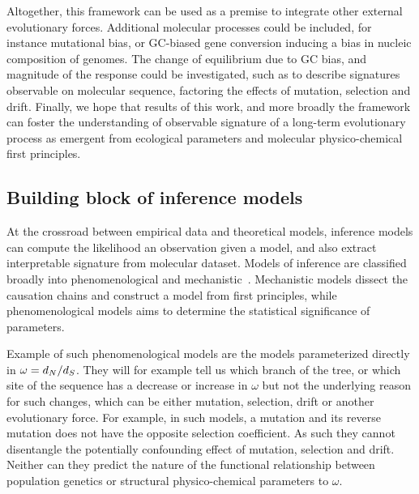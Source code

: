 Altogether, this framework can be used as a premise to integrate other external evolutionary forces. %
Additional molecular processes could be included, for instance mutational bias, or GC-biased gene conversion inducing a bias in nucleic composition of genomes.
The change of equilibrium due to GC bias, and magnitude of the response could be investigated, such as to describe signatures observable on molecular sequence, factoring the effects of mutation, selection and drift.
Finally, we hope that results of this work, and more broadly the framework can foster the understanding of observable signature of a long-term evolutionary process as emergent from ecological parameters and molecular physico-chemical first principles.

\subsection{Building block of inference models}

At the crossroad between empirical data and theoretical models, inference models can compute the likelihood an observation given a model, and also extract interpretable signature from molecular dataset.
Models of inference are classified broadly into phenomenological and mechanistic~\citep{Rodrigue2010a}.
Mechanistic models dissect the causation chains and construct a model from first principles, while phenomenological models aims to determine the statistical significance of parameters.

Example of such phenomenological models are the models parameterized directly in $\omega = d_N / d_S$.
They will for example tell us which branch of the tree, or which site of the sequence has a decrease or increase in $\omega$ but not the underlying reason for such changes, which can be either mutation, selection, drift or another evolutionary force.
For example, in such models, a mutation and its reverse mutation does not have the opposite selection coefficient.
As such they cannot disentangle the potentially confounding effect of mutation, selection and drift.
Neither can they predict the nature of the functional relationship between population genetics or structural physico-chemical parameters to $\omega$.

